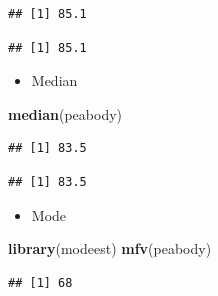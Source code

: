 \documentclass[
]{book}
\newenvironment{Shaded}{\begin{snugshade}}{\end{snugshade}}
\newcommand{\FunctionTok}[1]{\textcolor[rgb]{0.13,0.29,0.53}{\textbf{#1}}}
\newcommand{\NormalTok}[1]{#1}
\newcommand{\SpecialCharTok}[1]{\textcolor[rgb]{0.81,0.36,0.00}{\textbf{#1}}}
\providecommand{\tightlist}{%
  \setlength{\itemsep}{0pt}\setlength{\parskip}{0pt}}
\begin{document}
\begin{verbatim}
## [1] 85.1
\end{verbatim}

\begin{Shaded}
\end{Shaded}

\begin{verbatim}
## [1] 85.1
\end{verbatim}

\begin{itemize}
\tightlist
\item
  Median
\end{itemize}

\begin{Shaded}
\begin{Highlighting}[]
\FunctionTok{median}\NormalTok{(peabody)}
\end{Highlighting}
\end{Shaded}

\begin{verbatim}
## [1] 83.5
\end{verbatim}

\begin{Shaded}
\end{Shaded}

\begin{verbatim}
## [1] 83.5
\end{verbatim}

\begin{itemize}
\tightlist
\item
  Mode
\end{itemize}

\begin{Shaded}
\begin{Highlighting}[]
\FunctionTok{library}\NormalTok{(modeest)}
\FunctionTok{mfv}\NormalTok{(peabody)}
\end{Highlighting}
\end{Shaded}

\begin{verbatim}
## [1] 68
\end{verbatim}
\end{document}
